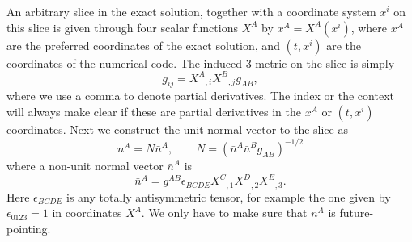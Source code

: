 An arbitrary slice in the exact solution, together with a coordinate
system $x^i$ on this slice is given through four scalar functions
$X^A$ by $x^A=X^A(x^i)$, where $x^A$ are the preferred coordinates of
the exact solution, and $(t,x^i)$ are the coordinates of the numerical
code.  The induced 3-metric on the slice is simply
\begin{equation}
\label{3-metric}
g_{ij} = {X^A}_{,i} {X^B}_{,j} g_{AB},
\end{equation}
where we use a comma to denote partial derivatives. The index or the
context  will always make
clear if these are partial derivatives in the $x^A$ or $(t,x^i)$
coordinates. Next we construct the unit normal vector to the slice
as
\begin{equation}
n^A = N \bar n^A, \qquad N = (\bar n^A \bar n^B g_{AB})^{-1/2}
\end{equation}
where a non-unit normal vector $\bar n^A$ is 
\begin{equation}
\bar n^A = g^{AB} \epsilon_{BCDE} {X^C}_{,1} {X^D}_{,2} {X^E}_{,3}.
\end{equation}
Here $\epsilon_{BCDE}$ is any totally antisymmetric tensor, for
example the one given by $\epsilon_{0123}=1$ in coordinates $X^A$. We
only have to make sure that $\bar n^A$ is future-pointing.


